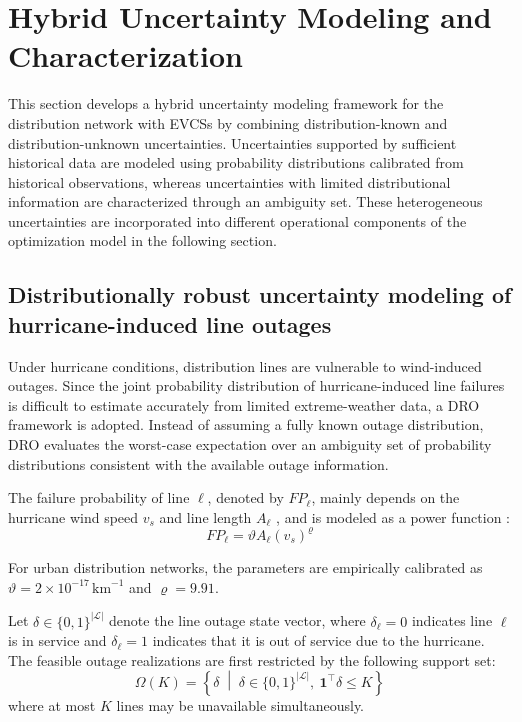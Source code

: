\documentclass[journal]{IEEEtran}
\providecommand{\1}{\mathbf{1}}
\begin{document}
\section{Hybrid Uncertainty Modeling and Characterization}
This section develops a hybrid uncertainty modeling framework for the distribution network with EVCSs by combining distribution-known and distribution-unknown uncertainties. Uncertainties supported by sufficient historical data are modeled using probability distributions calibrated from historical observations, whereas uncertainties with limited distributional information are characterized through an ambiguity set. These heterogeneous uncertainties are incorporated into different operational components of the optimization model in the following section.
\subsection{Distributionally robust uncertainty modeling of hurricane-induced line outages}

\hspace*{0.7em}Under hurricane conditions, distribution lines are vulnerable to wind-induced outages. Since the joint probability distribution of hurricane-induced line failures is difficult to estimate accurately from limited extreme-weather data, a DRO framework is adopted. Instead of assuming a fully known outage distribution, DRO evaluates the worst-case expectation over an ambiguity set of probability distributions consistent with the available outage information.

The failure probability of line ${\ell}$, denoted by $FP_{\ell}$, mainly depends on the hurricane wind speed 
$v_s$ and line length $A_{\ell}$
, and is modeled as a power function
\cite{Shi2021ResilientReconfiguration}:
\begin{equation}
FP_{\ell}=\vartheta A_{\ell}(v_s)^\varrho
\label{eq:FP}
\end{equation}

For urban distribution networks, the parameters are empirically calibrated as $\vartheta = 2 \times 10^{-17}\,\text{km}^{-1}$ and $\varrho = 9.91$.

Let ${\delta} \in \{0,1\}^{|\mathcal{L}|}$ denote the line outage state vector, where 
$\delta_{\ell}=0$ indicates line 
${\ell}$ is in service and 
$\delta_{\ell}=1$ indicates that it is out of service due to the hurricane. The feasible outage realizations are first restricted by the following support set:
\begin{equation}
\Omega(K)
=
\left\{
{\delta}
\;\middle|\;
{\delta} \in \{0,1\}^{|\mathcal{L}|},
\ \mathbf{1}^\top {\delta} \le K
\right\}
\label{eq:DR_ambiguity_set}
\end{equation}
where at most 
$K$ lines may be unavailable simultaneously.
\end{document}

